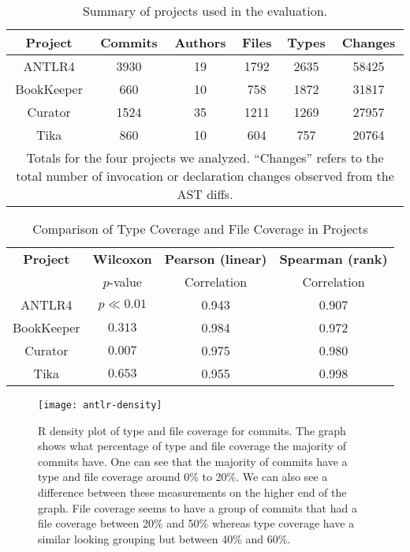 \begin{table}[t]
\renewcommand{\arraystretch}{1.3}
\centering
\caption{Summary of projects used in the evaluation.}
\label{tab:project-summary}
\begin{tabular}{c|ccccc}
\hline
\bfseries Project & \bfseries Commits & \bfseries Authors & \bfseries Files &   \bfseries Types &  \bfseries  Changes\\
\hline
ANTLR4 & 3930 & 19 & 1792 & 2635 & 58425\\
BookKeeper & 660 & 10 & 758 & 1872 & 31817\\
Curator & 1524 & 35 & 1211 & 1269 & 27957\\
Tika & 860 & 10 & 604 & 757 & 20764\\
\hline
\multicolumn{6}{p{3.25in}}{\footnotesize Totals for the four projects we analyzed. ``Changes'' refers to the total number of invocation or declaration changes observed from the AST diffs.}
\end{tabular}
\end{table}

\begin{table}[ht]
\renewcommand{\arraystretch}{1.3}
\caption{Comparison of Type Coverage and File Coverage in Projects}
\label{tab:summary}
\centering
\begin{tabular}{c|ccc}
\hline
\bfseries Project & \bfseries Wilcoxon& \bfseries Pearson (linear) & \bfseries Spearman (rank) \\
& $p$-value & Correlation & Correlation \\
\hline
ANTLR4 & $p\ll0.01$ & 0.943 & 0.907\\
BookKeeper & $0.313$ & 0.984 & 0.972\\
Curator & $0.007$ & 0.975 & 0.980\\
Tika & $0.653$ & 0.955 & 0.998\\
\hline
\end{tabular}
\end{table}

\begin{figure}[ht]
\centering
\texttt{[image: antlr-density]}
\caption{R density plot of type and file coverage for commits. The graph shows what percentage of type and file coverage the majority of commits have. One can see that the majority of commits have a type and file coverage around 0\% to 20\%. We can also see a difference between these measurements on the higher end of the graph. File coverage seems to have a group of commits that had a file coverage between 20\% and 50\% whereas type coverage have a similar looking grouping but between 40\% and 60\%.\label{fig:antlr4-density}}
\end{figure}

